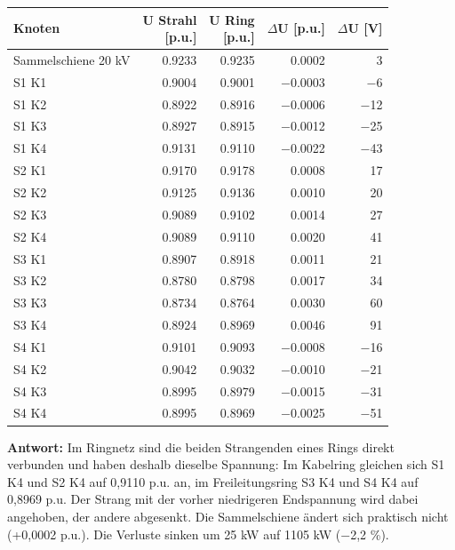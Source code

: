 \documentclass[11pt,a4paper]{article}
\begin{document}
\begin{table}[H]
\centering
\begin{adjustbox}{max width=\linewidth}
\begin{tabular}{lrrrr}
\toprule
\textbf{Knoten} & \thead{U Strahl \\ {[p.u.]}} & \thead{U Ring \\ {[p.u.]}} & \thead{$\Delta$U \\ {[p.u.]}} & \thead{$\Delta$U \\ {[V]}} \\
\midrule
Sammelschiene 20 kV & 0.9233 & 0.9235 & 0.0002 & 3 \\
S1 K1 & 0.9004 & 0.9001 & $-$0.0003 & $-$6 \\
S1 K2 & 0.8922 & 0.8916 & $-$0.0006 & $-$12 \\
S1 K3 & 0.8927 & 0.8915 & $-$0.0012 & $-$25 \\
S1 K4 & 0.9131 & 0.9110 & $-$0.0022 & $-$43 \\
S2 K1 & 0.9170 & 0.9178 & 0.0008 & 17 \\
S2 K2 & 0.9125 & 0.9136 & 0.0010 & 20 \\
S2 K3 & 0.9089 & 0.9102 & 0.0014 & 27 \\
S2 K4 & 0.9089 & 0.9110 & 0.0020 & 41 \\
S3 K1 & 0.8907 & 0.8918 & 0.0011 & 21 \\
S3 K2 & 0.8780 & 0.8798 & 0.0017 & 34 \\
S3 K3 & 0.8734 & 0.8764 & 0.0030 & 60 \\
S3 K4 & 0.8924 & 0.8969 & 0.0046 & 91 \\
S4 K1 & 0.9101 & 0.9093 & $-$0.0008 & $-$16 \\
S4 K2 & 0.9042 & 0.9032 & $-$0.0010 & $-$21 \\
S4 K3 & 0.8995 & 0.8979 & $-$0.0015 & $-$31 \\
S4 K4 & 0.8995 & 0.8969 & $-$0.0025 & $-$51 \\
\bottomrule
\end{tabular}
\end{adjustbox}
\end{table}

\textbf{Antwort:} Im Ringnetz sind die beiden Strangenden eines Rings direkt verbunden und haben deshalb dieselbe Spannung: Im Kabelring gleichen sich S1 K4 und S2 K4 auf 0,9110 p.u. an, im Freileitungsring S3 K4 und S4 K4 auf 0,8969 p.u. Der Strang mit der vorher niedrigeren Endspannung wird dabei angehoben, der andere abgesenkt. Die Sammelschiene ändert sich praktisch nicht (+0,0002 p.u.). Die Verluste sinken um 25 kW auf 1105 kW ($-$2,2 \%).
\end{document}
